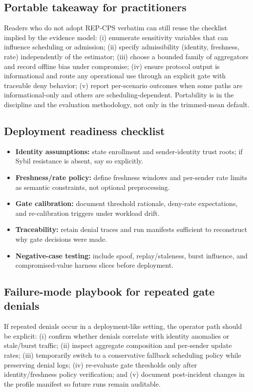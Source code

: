 \documentclass[11pt]{article}
\newcommand{\repcps}{REP-CPS}
\begin{document}
\subsection{Portable takeaway for practitioners}

Readers who do not adopt \repcps{} verbatim can still reuse the checklist implied by the evidence model: (i) enumerate sensitivity variables that can influence scheduling or admission; (ii) specify admissibility (identity, freshness, rate) independently of the estimator; (iii) choose a bounded family of aggregators and record offline bias under compromise; (iv) ensure protocol output is informational and route any operational use through an explicit gate with traceable deny behavior; (v) report per-scenario outcomes when some paths are informational-only and others are scheduling-dependent. Portability is in the discipline and the evaluation methodology, not only in the trimmed-mean default.

\subsection{Deployment readiness checklist}
\begin{itemize}[leftmargin=1.5em]
    \item \textbf{Identity assumptions:} state enrollment and sender-identity trust roots; if Sybil resistance is absent, say so explicitly.
    \item \textbf{Freshness/rate policy:} define freshness windows and per-sender rate limits as semantic constraints, not optional preprocessing.
    \item \textbf{Gate calibration:} document threshold rationale, deny-rate expectations, and re-calibration triggers under workload drift.
    \item \textbf{Traceability:} retain denial traces and run manifests sufficient to reconstruct why gate decisions were made.
    \item \textbf{Negative-case testing:} include spoof, replay/staleness, burst influence, and compromised-value harness slices before deployment.
\end{itemize}

\subsection{Failure-mode playbook for repeated gate denials}
If repeated denials occur in a deployment-like setting, the operator path should be explicit: (i) confirm whether denials correlate with identity anomalies or stale/burst traffic; (ii) inspect aggregate composition and per-sender update rates; (iii) temporarily switch to a conservative fallback scheduling policy while preserving denial logs; (iv) re-evaluate gate thresholds only after identity/freshness policy verification; and (v) document post-incident changes in the profile manifest so future runs remain auditable.
\end{document}
